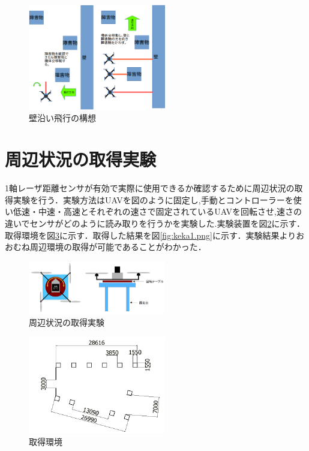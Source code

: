 \documentclass[twocolumn,11pt]{sotsuken_abst}
\begin{document}
\begin{figure}[htbp]
  \begin{center}
    \includegraphics[width=60mm]{img/5.png}
    \end{center}
  \caption{壁沿い飛行の構想}
 \label{fig:5.png}
\end{figure}

\section{周辺状況の取得実験}
1軸レーザ距離センサが有効で実際に使用できるか確認するために周辺状況の取得実験を行う．実験方法はUAVを図のように固定し,手動とコントローラーを使い低速・中速・高速とそれぞれの速さで固定されているUAVを回転させ,速さの違いでセンサがどのように読み取りを行うかを実験した.実験装置を図\ref{fig:7.png}に示す．取得環境を図\ref{fig:kankyou.png}に示す．取得した結果を図\ref{fig:keka1.png}に示す．実験結果よりおおむね周辺環境の取得が可能であることがわかった．

\begin{figure}[htbp]
  \begin{center}
    \includegraphics[width=60mm]{img/7.png}
    \end{center}
  \caption{周辺状況の取得実験}
 \label{fig:7.png}
\end{figure}

\begin{figure}[htbp]
  \begin{center}
    \includegraphics[width=60mm]{img/kankyou.png}
    \end{center}
  \caption{取得環境}
 \label{fig:kankyou.png}
\end{figure}
\end{document}

